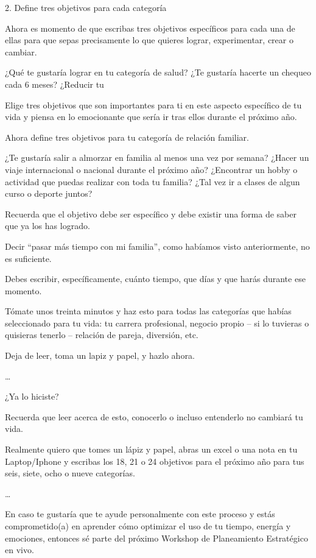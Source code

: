 \documentclass[12pt]{book}
\begin{document}
2. Define tres objetivos para cada categoría

Ahora es momento de que escribas tres objetivos específicos para cada una de ellas para que sepas precisamente lo que quieres lograr, experimentar, crear o cambiar.

¿Qué te gustaría lograr en tu categoría de salud? ¿Te gustaría hacerte un chequeo cada 6 meses? ¿Reducir tu %

Elige tres objetivos que son importantes para ti en este aspecto específico de tu vida y piensa en lo emocionante que sería ir tras ellos durante el próximo año.

Ahora define tres objetivos para tu categoría de relación familiar.

¿Te gustaría salir a almorzar en familia al menos una vez por semana? ¿Hacer un viaje internacional o nacional durante el próximo año? ¿Encontrar un hobby o actividad que puedas realizar con toda tu familia? ¿Tal vez ir a clases de algun curso o deporte juntos?

Recuerda que el objetivo debe ser específico y debe existir una forma de saber que ya los has logrado.

Decir “pasar más tiempo con mi familia”, como habíamos visto anteriormente, no es suficiente.

Debes escribir, específicamente, cuánto tiempo, que días y que harás durante ese momento.

Tómate unos treinta minutos y haz esto para todas las categorías que habías seleccionado para tu vida: tu carrera profesional, negocio propio – si lo tuvieras o quisieras tenerlo – relación de pareja, diversión, etc.

Deja de leer, toma un lapiz y papel, y hazlo ahora.

…

¿Ya lo hiciste?

Recuerda que leer acerca de esto, conocerlo o incluso entenderlo no cambiará tu vida.

Realmente quiero que tomes un lápiz y papel, abras un excel o una nota en tu Laptop/Iphone y escribas los 18, 21 o 24 objetivos para el próximo año para tus seis, siete, ocho o nueve categorías.

…

En caso te gustaría que te ayude personalmente con este proceso y estás comprometido(a) en aprender cómo optimizar el uso de tu tiempo, energía y emociones, entonces sé parte del próximo Workshop de Planeamiento Estratégico en vivo.
\end{document}
